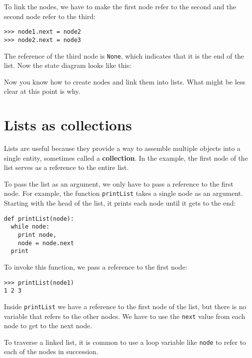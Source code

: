 \beforefig
\centerline{}
\afterfig

To link the nodes, we have to make the first node refer to the
second and the second node refer to the third:

\beforeverb
\begin{verbatim}
>>> node1.next = node2
>>> node2.next = node3
\end{verbatim}
\afterverb
%
The reference of the third node is {\tt None}, which indicates that
it is the end of the list.  Now the state diagram looks like this:

\beforefig
\centerline{}
\afterfig

Now you know how to create nodes and link them into lists.  What
might be less clear at this point is why.


\section{Lists as collections}

Lists are useful because they provide a way to assemble multiple
objects into a single entity, sometimes called a {\bf collection}.  In
the example, the first node of the list serves as a reference to the
entire list.


To pass the list as an argument, we only have to pass a
reference to the first node.  For example, the function {\tt printList}
takes a single node as an argument.  Starting with the head of the
list, it prints each node until it gets to the end:

\beforeverb
\begin{verbatim}
def printList(node):
  while node:
    print node,
    node = node.next
  print
\end{verbatim}
\afterverb
%
To invoke this function, we pass a reference to the
first node:

\beforeverb
\begin{verbatim}
>>> printList(node1)
1 2 3
\end{verbatim}
\afterverb
%
Inside {\tt printList} we have a reference to the first node
of the list, but there is no variable that refers to the other
nodes.  We have to use the {\tt next} value from each node
to get to the next node.

To traverse a linked list, it is common to use a loop variable like
{\tt node} to refer to each of the nodes in succession.

